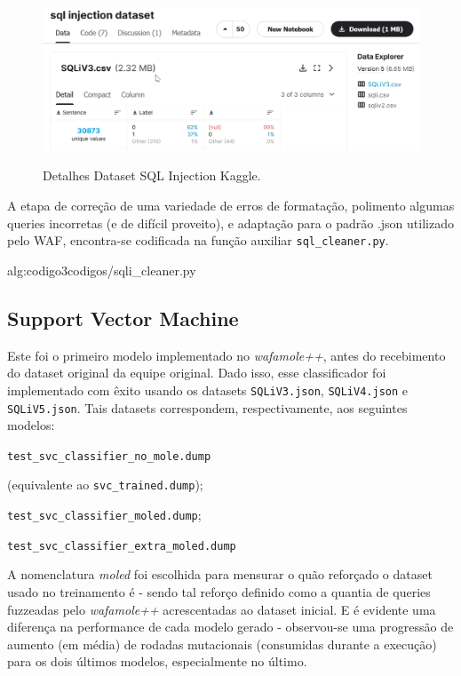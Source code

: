 \begin{figure}[ht]
    \centering
    \caption{Detalhes Dataset SQL Injection Kaggle.}
    \includegraphics[width=16cm]{figuras/sqlInjectionDataset.png} 
    \label{fig:internet} 
\end{figure}

A etapa de correção de uma variedade de erros de formatação, polimento algumas queries incorretas (e de difícil proveito), e adaptação para o padrão .json utilizado pelo WAF, encontra-se codificada na função auxiliar \verb+sql_cleaner.py+.


\label{sec:codigos:sqli_cleaner}
 {alg:codigo3}{codigos/sqli_cleaner.py}
\bigskip


\subsection{Support Vector Machine}
Este foi o primeiro modelo implementado no \textit{wafamole++}, antes do recebimento do dataset original da equipe original. Dado isso, esse classificador foi implementado com êxito usando os datasets \verb+SQLiV3.json+, \verb+SQLiV4.json+ e \verb+SQLiV5.json+. Tais datasets correspondem, respectivamente, aos seguintes modelos:
\begin{alineas}
\item \verb+test_svc_classifier_no_mole.dump+

(equivalente ao \verb+svc_trained.dump+);
\item \verb+test_svc_classifier_moled.dump+;
\item \verb+test_svc_classifier_extra_moled.dump+ 
\end{alineas}

A nomenclatura \textit{moled} foi escolhida para mensurar o quão reforçado o dataset usado no treinamento é - sendo tal reforço definido como a quantia de queries fuzzeadas pelo \textit{wafamole++} acrescentadas ao dataset inicial. E é evidente uma diferença na performance de cada modelo gerado - observou-se uma progressão de aumento (em média) de rodadas mutacionais (consumidas durante a execução) para os dois últimos modelos, especialmente no último.

